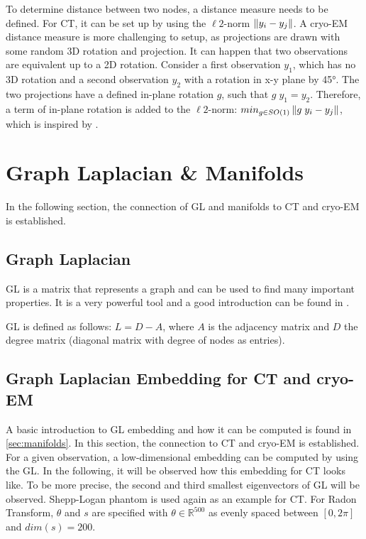 To determine distance between two nodes, a distance measure needs to be defined.
For CT, it can be set up by using the $\ell2$-norm $\left\lVert y_i - y_j\right\rVert$.
A cryo-EM distance measure is more challenging to setup, as projections are drawn with some random 3D rotation and projection.
It can happen that two observations are equivalent up to a 2D rotation. 
Consider a first observation $y_1$, which has no 3D rotation and 
a second observation $y_2$ with a rotation in x-y plane by 45°.
The two projections have a defined in-plane rotation $g$, such that $g \; y_1 = y_2$.
Therefore, a term of in-plane rotation is added to the $\ell2$-norm: $min_{g \in SO(1)}\left\lVert g \;y_i - y_j\right\rVert$, 
which is inspired by \cite{multiDiffusionMaps}.


\section{Graph Laplacian \& Manifolds}
In the following section, the connection of GL and manifolds to CT and cryo-EM is established.

\subsection{Graph Laplacian}
GL is a matrix that represents a graph and can be used to find many important properties.
It is a very powerful tool and a good introduction can be found in \cite{tutorialSpectralClustering, SpectralGraphTheory}. 

GL is defined as follows: $L = D - A$, where $A$ is the adjacency matrix and $D$ the degree matrix (diagonal matrix with degree of nodes as entries).

\subsection{Graph Laplacian Embedding for CT and cryo-EM}
A basic introduction to GL embedding and how it can be computed is found in \ref{sec:manifolds}.
In this section, the connection to CT and cryo-EM is established.
For a given observation, a low-dimensional embedding can be computed by using the GL.
In the following, it will be observed how this embedding for CT looks like.
To be more precise, the second and third smallest eigenvectors of GL will be observed.
Shepp-Logan phantom is used again as an example for CT.
For Radon Transform, $\theta$ and $s$ are specified with $\theta \in \mathbb{R}^{500}$ as evenly spaced
between $[0, 2 \pi]$ and $dim(s) = 200$. 

